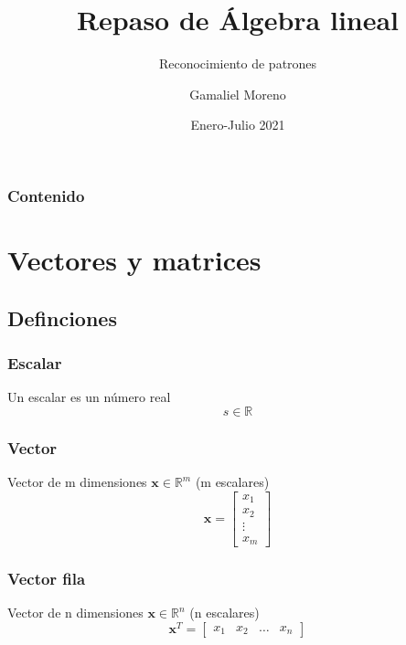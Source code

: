 \documentclass{beamer}
\title{Repaso de Álgebra lineal}
\subtitle{Reconocimiento de patrones}
\author{Gamaliel Moreno}
\date{Enero-Julio 2021}
\institute{\url{gamalielmch@uaz.edu.mx}\\\url{http://pds.uaz.edu.mx/}}
\begin{document}
\begin{frame}[plain,t]
\titlepage
\end{frame}

\begin{frame}%
	\frametitle{Contenido}
\tableofcontents
\end{frame}


\section{Vectores y matrices}
\subsection{Definciones}
\begin{frame}
\frametitle{Escalar}
Un escalar es un número real
\begin{equation*}
s\in \mathbb{R}
\end{equation*}
\end{frame}
\begin{frame}
\frametitle{Vector}
Vector de m dimensiones $\boldsymbol{x} \in \mathbb{R}^m$ (m escalares) 
\begin{equation*}
\boldsymbol{x} = \begin{bmatrix} x_1 \\ x_2 \\ \vdots \\ x_m \end{bmatrix}
\end{equation*}
\end{frame}
\begin{frame}
\frametitle{Vector fila}
Vector de n dimensiones $\boldsymbol{x} \in \mathbb{R}^n$ (n escalares) 
\begin{equation*}
\boldsymbol{x}^T = \begin{bmatrix} x_1 &  x_2 & \dots & x_n \end{bmatrix}
\end{equation*}
\end{frame}
\end{document}
